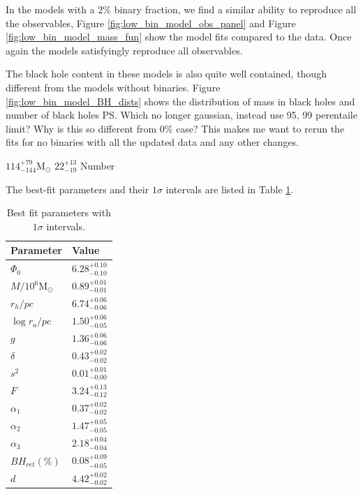 In the models with a $2\%$ binary fraction, we find a similar ability to reproduce all the
observables, Figure \ref{fig:low_bin_model_obs_panel} and Figure \ref{fig:low_bin_model_mass_fun}
show the model fits compared to the data. Once again the models satisfyingly reproduce all
observables.

The black hole content in these models is also quite well contained, though different from the
models without binaries. Figure \ref{fig:low_bin_model_BH_dists} shows the distribution of mass in
black holes and number of black holes \ps{Which no longer gaussian, instead use 95, 99 perentaile
	limit? Why is this so different from $0\%$ case? This makes me want to rerun the fits for no
	binaries with all the updated data and any other changes.}


$114^{+79}_{-144} \mathrm{M}_\odot$
$22^{+13}_{-19}$ Number


The best-fit parameters and their $1\sigma$ intervals are listed in Table \ref{tab:parameters_lowbin}.


\begin{table}
	\centering
	\caption{Best fit parameters with $1\sigma$ intervals.}
	\begin{tabular}{l l}

		\hline
		Parameter                 & Value                  \\
		\hline
		$\Phi_0$                  & $6.28^{+0.10}_{-0.10}$ \\
		$M/10^6 \mathrm{M}_\odot$ & $0.89^{+0.01}_{-0.01}$ \\
		$r_h / pc$                & $6.74^{+0.06}_{-0.06}$ \\
		$\log{r_a / pc}$          & $1.50^{+0.06}_{-0.05}$ \\
		$g$                       & $1.36^{+0.06}_{-0.06}$ \\
		$\delta$                  & $0.43^{+0.02}_{-0.02}$ \\
		$s^2$                     & $0.01^{+0.01}_{-0.00}$ \\
		$F$                       & $3.24^{+0.13}_{-0.12}$ \\
		$\alpha_1$                & $0.37^{+0.02}_{-0.02}$ \\
		$\alpha_2$                & $1.47^{+0.05}_{-0.05}$ \\
		$\alpha_3$                & $2.18^{+0.04}_{-0.04}$ \\
		$BH_{ret} (\%)$           & $0.08^{+0.09}_{-0.05}$ \\
		$d$                       & $4.42^{+0.02}_{-0.02}$ \\
		\hline
	\end{tabular}
	\label{tab:parameters_lowbin}
\end{table}

